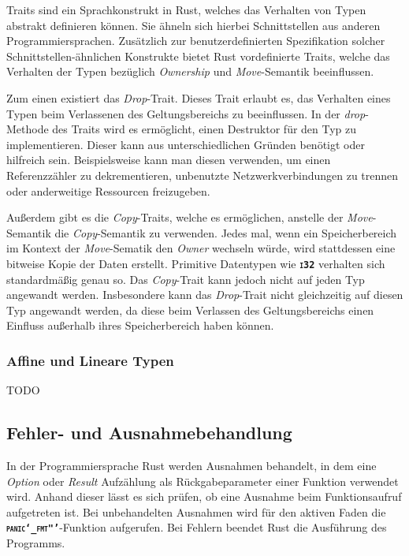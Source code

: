 Traits sind ein Sprachkonstrukt in Rust, welches das Verhalten von Typen abstrakt definieren können. Sie ähneln sich
hierbei Schnittstellen aus anderen Programmiersprachen. Zusätzlich zur benutzerdefinierten Spezifikation
solcher Schnittstellen-ähnlichen Konstrukte bietet Rust vordefinierte Traits, welche das Verhalten der Typen
bezüglich \textit{Ownership} und \textit{Move}-Semantik beeinflussen.\cite{rustBook}

Zum einen existiert das \textit{Drop}-Trait. Dieses Trait erlaubt es, das Verhalten eines Typen beim Verlassenen des
Geltungsbereichs zu beeinflussen. In der \textit{drop}-Methode des Traits wird es ermöglicht, einen Destruktor
für den Typ zu implementieren. Dieser kann aus unterschiedlichen Gründen benötigt oder hilfreich sein.
Beispielsweise kann man diesen verwenden, um einen Referenzzähler zu dekrementieren, unbenutzte Netzwerkverbindungen
zu trennen oder anderweitige Ressourcen freizugeben.\cite{rustBook}

Außerdem gibt es die \textit{Copy}-Traits, welche es ermöglichen, anstelle der \textit{Move}-Semantik die
\textit{Copy}-Semantik zu verwenden. Jedes mal, wenn ein Speicherbereich im Kontext der \textit{Move}-Sematik
den \textit{Owner} wechseln würde, wird
stattdessen eine bitweise Kopie der Daten erstellt. Primitive Datentypen wie \texttt{\textsc{\textbf{i32}}}
verhalten sich standardmäßig genau so. Das \textit{Copy}-Trait kann jedoch nicht auf jeden Typ
angewandt werden. Insbesondere kann das \textit{Drop}-Trait nicht gleichzeitig auf diesen Typ angewandt werden,
da diese beim Verlassen des Geltungsbereichs einen Einfluss außerhalb ihres Speicherbereich haben können. \cite{rustBook}\cite{rustDocCopy}

\subsubsection{Affine und Lineare Typen}

TODO

\subsection{Fehler- und Ausnahmebehandlung}

In der Programmiersprache Rust werden Ausnahmen behandelt,
in dem eine \textit{Option} oder \textit{Result} Aufzählung als
Rückgabeparameter einer Funktion verwendet wird.
Anhand dieser lässt es sich prüfen, ob eine Ausnahme beim Funktionsaufruf
aufgetreten ist. Bei unbehandelten Ausnahmen wird für den aktiven Faden die
\texttt{\textsc{\textbf{panic\char`_fmt"'}}}-Funktion aufgerufen.
Bei Fehlern beendet Rust die Ausführung des Programms.

